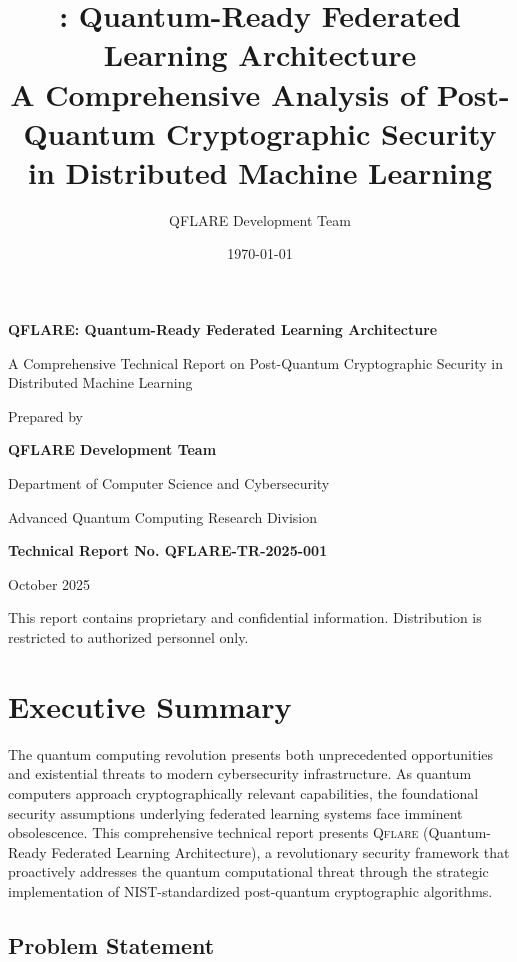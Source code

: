 \documentclass[12pt,a4paper,twoside]{book}
\title{\qflare: Quantum-Ready Federated Learning Architecture\\
\large A Comprehensive Analysis of Post-Quantum Cryptographic Security in Distributed Machine Learning}
\author{QFLARE Development Team}
\date{\today}
\newcommand{\qflare}{\textsc{Qflare}}
\begin{document}
\frontmatter
\begin{titlepage}
\centering
\vspace*{2cm}
{\huge\bfseries QFLARE: Quantum-Ready Federated Learning Architecture\par}
\vspace{0.5cm}
{\Large A Comprehensive Technical Report on Post-Quantum Cryptographic Security in Distributed Machine Learning\par}
\vspace{2cm}
{\large Prepared by\par}
{\Large\bfseries QFLARE Development Team\par}
\vspace{2cm}
{\large Department of Computer Science and Cybersecurity\par}
\vspace{0.5cm}
{\large Advanced Quantum Computing Research Division\par}
\vspace{3cm}
{\large\bfseries Technical Report No. QFLARE-TR-2025-001\par}
\vspace{1cm}
{\large October 2025\par}
\vfill
{\footnotesize This report contains proprietary and confidential information. Distribution is restricted to authorized personnel only.\par}
\end{titlepage}

\newpage

\chapter*{Executive Summary}

The quantum computing revolution presents both unprecedented opportunities and existential threats to modern cybersecurity infrastructure. As quantum computers approach cryptographically relevant capabilities, the foundational security assumptions underlying federated learning systems face imminent obsolescence. This comprehensive technical report presents \qflare{} (Quantum-Ready Federated Learning Architecture), a revolutionary security framework that proactively addresses the quantum computational threat through the strategic implementation of NIST-standardized post-quantum cryptographic algorithms.

\section*{Problem Statement}
\end{document}
